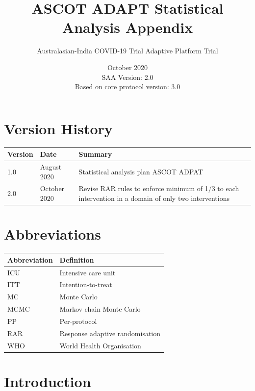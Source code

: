 \documentclass[
  11pt,
]{article}
\title{ASCOT ADAPT Statistical Analysis Appendix}
\subtitle{Australasian-India COVID-19 Trial Adaptive Platform Trial}
\author{}
\date{\vspace{-2.5em}October 2020\\
SAA Version: 2.0\\
Based on core protocol version: 3.0}
\begin{document}
\maketitle

{
\setcounter{tocdepth}{2}
\tableofcontents
}
\hypertarget{version-history}{%
\section*{Version History}\label{version-history}}

\begin{center}
    \begin{tabular}{llp{8cm}}
    \hline
    Version & Date & Summary \\ \hline
    1.0 & August 2020 & Statistical analysis plan ASCOT ADPAT \\
    2.0 & October 2020 & Revise RAR rules to enforce minimum of 1/3 to each intervention in a domain of only two interventions \\
    \hline
    \end{tabular}
\end{center}

\hypertarget{abbreviations}{%
\section*{Abbreviations}\label{abbreviations}}

\begin{table}[H]
\centering
\begin{tabular}{ll}
\toprule
Abbreviation & Definition\\
\midrule
ICU & Intensive care unit\\
ITT & Intention-to-treat\\
MC & Monte Carlo\\
MCMC & Markov chain Monte Carlo\\
PP & Per-protocol\\
RAR & Response adaptive randomisation\\
WHO & World Health Organisation\\
\bottomrule
\end{tabular}
\end{table}

\clearpage

\hypertarget{introduction}{%
\section{Introduction}\label{introduction}}
\end{document}
